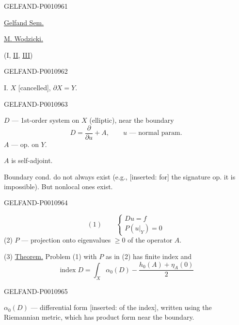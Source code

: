 \begin{GelfandAdjacentEvidence}{GELFAND-P001096}{1}
\begin{center}
\qquad\underline{Gelfand Sem.}
\end{center}

\underline{M. Wodzicki.}

 (I, \underline{II}, \underline{III})
\end{GelfandAdjacentEvidence}
\begin{GelfandAdjacentEvidence}{GELFAND-P001096}{2}


I. $X$ [cancelled], $\partial X=Y$.
\end{GelfandAdjacentEvidence}
\begin{GelfandAdjacentEvidence}{GELFAND-P001096}{3}


$D$ — 1st-order system on $X$ (elliptic), near the boundary
\[
D=\frac{\partial}{\partial u}+A,\qquad
u\text{ — normal param.}
\]
$A$ — op. on $Y$.

$A$ is self-adjoint.

Boundary cond. do not always exist (e.g., [inserted: for] the signature op. it is impossible). But nonlocal ones exist.
\end{GelfandAdjacentEvidence}
\begin{GelfandAdjacentEvidence}{GELFAND-P001096}{4}


\[
(1)\qquad
\begin{cases}
Du=f\\
P(u|_Y)=0
\end{cases}
\]
(2) $P$ — projection onto eigenvalues $\ge 0$ of the operator $A$.

(3) \underline{Theorem.} Problem (1) with $P$ as in (2) has finite index and
\[
\operatorname{index}D=\int_X\alpha_0(D)-\frac{h_0(A)+\eta_A(0)}{2}
\]
\end{GelfandAdjacentEvidence}
\begin{GelfandAdjacentEvidence}{GELFAND-P001096}{5}


$\alpha_0(D)$ — differential form [inserted: of the index], written using the Riemannian metric, which has product form near the boundary.
\end{GelfandAdjacentEvidence}
